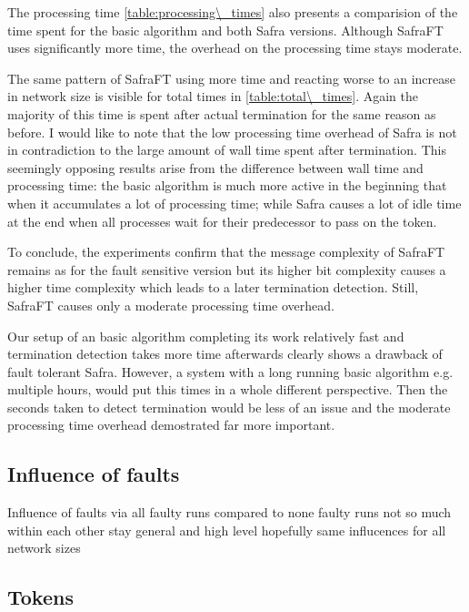 The processing time \cref{table:processing\_times} also presents a comparision of the time spent for the basic algorithm and both Safra versions.
Although SafraFT uses significantly more time, the overhead on the processing time stays moderate.

The same pattern of SafraFT using more time and reacting worse to an increase in network size is visible for total times in \cref{table:total\_times}.
Again the majority of this time is spent after actual termination for the same reason as before.
I would like to note that the low processing time overhead of Safra is not in contradiction to the large amount of wall time spent after termination.
This seemingly opposing results arise from the difference between wall time and processing time: the basic algorithm is much more active in the beginning that when it accumulates a lot of processing time; while Safra causes a lot of idle time at the end when all processes wait for their predecessor to pass on the token.

To conclude, the experiments confirm that the message complexity of SafraFT remains as for the fault sensitive version but its higher bit complexity causes a higher time complexity which leads to a later termination detection. 
Still, SafraFT causes only a moderate processing time overhead.

Our setup of an basic algorithm completing its work relatively fast and termination detection takes more time afterwards clearly shows a drawback of fault tolerant Safra.
However, a system with a long running basic algorithm e.g. multiple hours, would put this times in a whole different perspective.
Then the seconds taken to detect termination would be less of an issue and the moderate processing time overhead demostrated far more important.


\subsection{Influence of faults}

Influence of faults via all faulty runs compared to none faulty runs not so much within each other
stay general and high level
hopefully same influcences for all network sizes



\subsection{Tokens}

